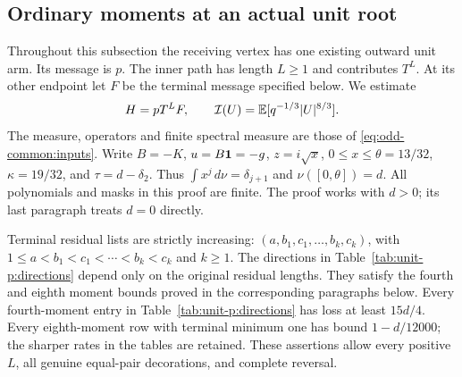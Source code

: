 \subsection{Ordinary moments at an actual unit root}
\label{sec:unit-p-root-packets}
Throughout this subsection the receiving vertex has one existing
outward unit arm. Its message is \(p\). The inner path has length
\(L\ge1\) and contributes \(T^L\). At its other endpoint let \(F\)
be the terminal message specified below. We estimate
\[
 H=pT^LF,\qquad
 \mathcal I(U)=\mathbb E[q^{-1/3}|U|^{8/3}].
\]
The measure, operators and finite spectral measure are those of
\eqref{eq:odd-common:inputs}. Write \(B=-K\), \(u=B\mathbf1=-g\),
\(z=i\sqrt x\), \(0\le x\le\theta=13/32\),
\(\kappa=19/32\), and \(\tau=d-\delta_2\).
Thus \(\int x^j\,d\nu=\delta_{j+1}\) and \(\nu([0,\theta])=d\).
All polynomials and masks in this proof are finite. The proof works
with \(d>0\); its last paragraph treats \(d=0\) directly.

\begin{theorem}
\label{thm:unit-p:catalogue}
Terminal residual lists are strictly increasing:
\((a,b_1,c_1,\ldots,b_k,c_k)\), with
\(1\le a<b_1<c_1<\cdots<b_k<c_k\) and \(k\ge1\).
The directions in Table~\ref{tab:unit-p:directions} depend only on
the original residual lengths. They satisfy the fourth and eighth
moment bounds proved in the corresponding paragraphs below.
Every fourth-moment entry in Table~\ref{tab:unit-p:directions}
has loss at least \(15d/4\).
Every eighth-moment row with terminal minimum one has bound
\(1-d/12000\); the sharper rates in the tables are retained.
These assertions allow every positive \(L\), all genuine equal-pair
decorations, and complete reversal.
\end{theorem}

